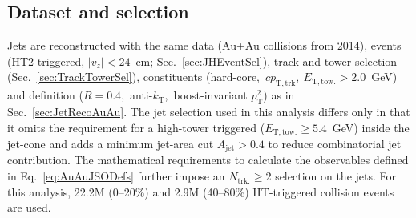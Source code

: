 \subsection{Dataset and selection}
Jets are reconstructed with the same data (Au+Au collisions from 2014), events (HT2-triggered, \(|v_z| < 24\)~cm; Sec.~\ref{sec:JHEventSel}), track and tower selection (Sec.~\ref{sec:TrackTowerSel}), constituents (hard-core,~\(cp_\mathrm{T, trk},~E_\mathrm{T, tow.} > 2.0\)~GeV)  and definition (\(R=0.4\),~anti-\(k_\mathrm{T}\),~boost-invariant \(p_\mathrm{T}^2\)) as in Sec.~\ref{sec:JetRecoAuAu}. 
%
The jet selection used in this analysis differs only in that it omits the requirement for a high-tower triggered (\(E_\mathrm{T, tow.} \geq 5.4\)~GeV) inside the jet-cone and adds a minimum jet-area cut \(A_\mathrm{jet} > 0.4\) to reduce combinatorial jet contribution.
%
The mathematical requirements to calculate the observables defined in Eq.~\ref{eq:AuAuJSODefs} further impose an \(N_\mathrm{trk.} \geq 2\) selection on the jets.
%
For this analysis, 22.2M (0--20\%) and 2.9M (40--80\%) HT-triggered collision events are used.

